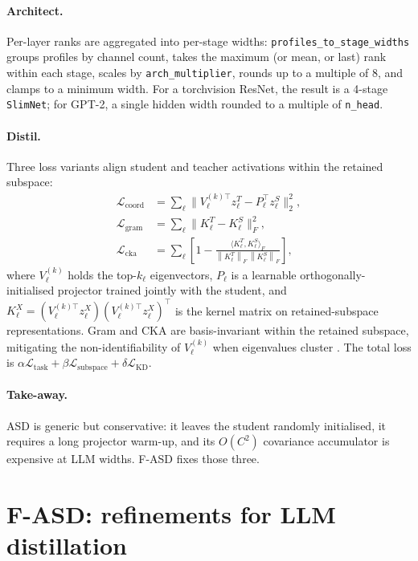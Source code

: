\documentclass[11pt]{article}
\newcommand{\norm}[1]{\left\lVert#1\right\rVert}
\newcommand{\fasd}{\textsc{F-ASD}}
\newcommand{\asd}{\textsc{ASD}}
\begin{document}
\paragraph{Architect.}
Per-layer ranks are aggregated into per-stage widths:
\texttt{profiles\_to\_stage\_widths} groups profiles by channel count,
takes the maximum (or mean, or last) rank within each stage, scales by
\texttt{arch\_multiplier}, rounds up to a multiple of $8$, and clamps to
a minimum width. For a torchvision ResNet, the result is a 4-stage
\texttt{SlimNet}; for GPT-2, a single hidden width rounded to a multiple
of \texttt{n\_head}.

\paragraph{Distil.}
Three loss variants align student and teacher activations within the
retained subspace:
\begin{align}
\mathcal{L}_{\mathrm{coord}} &= \sum_\ell \big\| V_\ell^{(k)\top} z^T_\ell - P_\ell^\top z^S_\ell \big\|_2^2,\\
\mathcal{L}_{\mathrm{gram}}  &= \sum_\ell \big\| K^T_\ell - K^S_\ell \big\|_F^2,\\
\mathcal{L}_{\mathrm{cka}}   &= \sum_\ell \!\left[1 - \tfrac{\langle K^T_\ell, K^S_\ell \rangle_F}{\norm{K^T_\ell}_F \, \norm{K^S_\ell}_F}\right]\!,
\end{align}
where $V_\ell^{(k)}$ holds the top-$k_\ell$ eigenvectors,
$P_\ell$ is a learnable orthogonally-initialised projector trained
jointly with the student, and
$K^X_\ell = (V_\ell^{(k)\top} z^X_\ell)(V_\ell^{(k)\top} z^X_\ell)^\top$
is the kernel matrix on retained-subspace representations. Gram and CKA
are basis-invariant within the retained subspace, mitigating the
non-identifiability of $V_\ell^{(k)}$ when eigenvalues cluster
\citep{Kornblith2019CKA}. The total loss is
$\alpha\mathcal{L}_{\mathrm{task}} + \beta\mathcal{L}_{\mathrm{subspace}} + \delta\mathcal{L}_{\mathrm{KD}}$.

\paragraph{Take-away.}
\asd{} is generic but conservative: it leaves the student randomly
initialised, it requires a long projector warm-up, and its
$O(C^2)$ covariance accumulator is expensive at LLM widths.
\fasd{} fixes those three.

\section{F-ASD: refinements for LLM distillation}
\label{sec:fasd}
\end{document}
